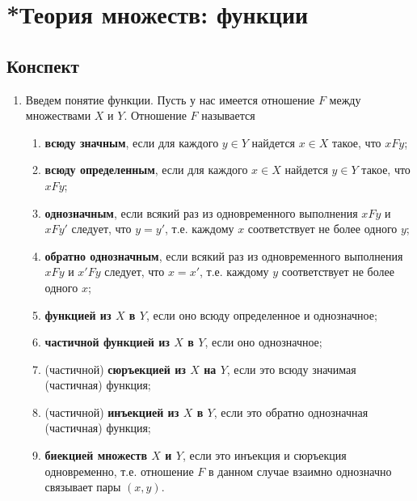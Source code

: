 

\section{*Теория множеств: функции}\label{functions}

\subsection*{Конспект}

\begin{enumerate}
\item Введем понятие функции. Пусть у нас имеется отношение $F$ между множествами $X$ и $Y$. Отношение $F$ называется
\begin{enumerate}[{\bf Func1}]
\item \textbf{всюду значным}, если для каждого $y\in Y$ найдется $x\in X$ такое, что $xFy$;
\item \textbf{всюду определенным}, если для каждого $x\in X$ найдется $y\in Y$ такое, что $xFy$;
\item \textbf{однозначным}, если всякий раз из одновременного выполнения $xFy$ и $xFy'$ следует, что $y=y'$, т.е. каждому $x$ соответствует не более одного $y$;
\item \textbf{обратно однозначным}, если всякий раз из одновременного выполнения $xFy$ и $x'Fy$ следует, что $x=x'$, т.е. каждому $y$ соответствует не более одного $x$;
\item \textbf{функцией из $X$ в $Y$}, если оно всюду определенное и однозначное;
\item \textbf{частичной функцией из $X$ в $Y$}, если оно однозначное;
\item (частичной) \textbf{сюръекцией из $X$ на $Y$}, если это всюду значимая (частичная) функция;
\item (частичной) \textbf{инъекцией из $X$ в $Y$}, если это обратно однозначная (частичная) функция;
\item \textbf{биекцией множеств $X$ и $Y$}, если это инъекция и сюръекция одновременно, т.е. отношение $F$ в данном случае взаимно однозначно связывает пары $(x,y)$.
\end{enumerate}
\begin{center}

\end{center}
\end{enumerate}
